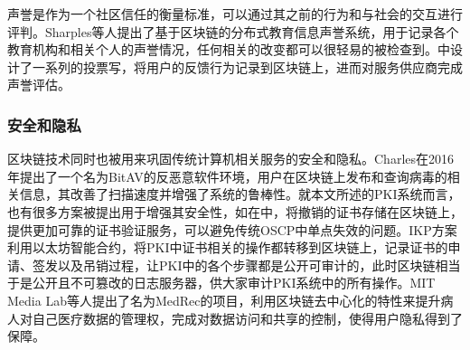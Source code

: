 声誉是作为一个社区信任的衡量标准，可以通过其之前的行为和与社会的交互进行评判。Sharples等人提出了基于区块链的分布式教育信息声誉系统\supercite{sharples2016blockchain}，用于记录各个教育机构和相关个人的声誉情况，任何相关的改变都可以很轻易的被检查到。\parencite{carboni2015feedback}中设计了一系列的投票写，将用户的反馈行为记录到区块链上，进而对服务供应商完成声誉评估。


\subsubsection{安全和隐私}

区块链技术同时也被用来巩固传统计算机相关服务的安全和隐私。Charles在2016年提出了一个名为BitAV的反恶意软件环境，用户在区块链上发布和查询病毒的相关信息，其改善了扫描速度并增强了系统的鲁棒性。就本文所述的PKI系统而言，也有很多方案被提出用于增强其安全性，如在\parencite{baldi2017certificate}中，将撤销的证书存储在区块链上，提供更加可靠的证书验证服务，可以避免传统OSCP中单点失效的问题。IKP\supercite{matsumoto2016ikp}方案利用以太坊智能合约，将PKI中证书相关的操作都转移到区块链上，记录证书的申请、签发以及吊销过程，让PKI中的各个步骤都是公开可审计的，此时区块链相当于是公开且不可篡改的日志服务器，供大家审计PKI系统中的所有操作。MIT Media Lab等人提出了名为MedRec\supercite{azaria2016medrec}的项目，利用区块链去中心化的特性来提升病人对自己医疗数据的管理权，完成对数据访问和共享的控制，使得用户隐私得到了保障。









